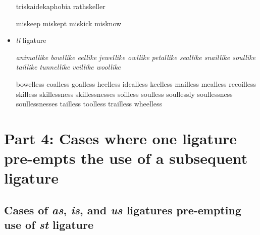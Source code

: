 \begin{itemize}
triskaidekaphobia rathskeller

miskeep miskept miskick misknow

\egroup



\item \emph{ll} ligature

\bgroup \em
animallike bowllike eellike jewellike owllike petallike seallike snaillike soullike taillike tunnellike veillike woollike

bowelless coalless goalless heelless idealless keelless mailless mealless recoilless skilless skillessness skillessnesses soilless soulless soullessly soullessness soullessnesses tailless toolless trailless wheelless

\egroup
\end{itemize}


\section*{Part 4: Cases where one ligature pre-empts the use of a subsequent ligature}

\subsection*{Cases of \emph{as}, \emph{is}, and \emph{us} ligatures pre-empting use of \emph{st} ligature}

\bgroup \em

